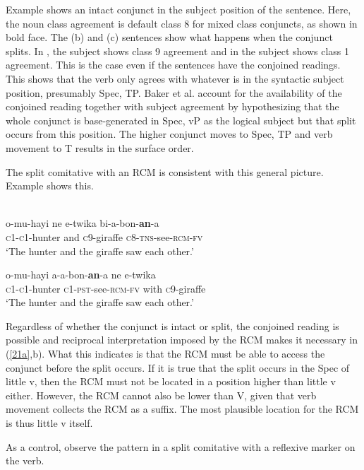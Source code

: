 \documentclass[output=paper]{langsci/langscibook}
\begin{document}
Example  shows an intact conjunct in the subject position of the sentence. Here, the noun class agreement is default class 8 for mixed class conjuncts, as shown in bold face. The (b) and (c) sentences show what happens when the conjunct splits. In , the subject shows class 9 agreement and in  the subject shows class 1 agreement. This is the case even if the sentences have the conjoined readings. This shows that the verb only agrees with whatever is in the syntactic subject position, presumably Spec, TP. Baker et al. account for the availability of the conjoined reading together with subject agreement by hypothesizing that the whole conjunct is base-generated in Spec, vP as the logical subject but that split occurs from this position. The higher conjunct moves to Spec, TP and verb movement to T results in the surface order.  

The split comitative with an RCM is consistent with this general picture. Example  shows this.


\ea\label{ex:safir:21}
  \\
\ea\label{ex:safir:21a}
\gll  o-mu-hayi   ne   e-twika   bi-a-bon-\textbf{an}-a  \\
       \textsc{c1-c1}-hunter   and   \textsc{c}9-giraffe   \textsc{c8-tns}-see-\textsc{rcm}\textsc{-fv} \\
\glt   ‘The hunter and the giraffe saw each other.’

\ex\label{ex:safir:21b}
\gll   o-mu-hayi     a-a-bon-\textbf{an}-a     ne   e-twika\\
       \textsc{c1-c1}-hunter    \textsc{c1-pst}-see-\textsc{rcm}\textsc{-fv}  with  \textsc{c}9-giraffe   \\
\glt   ‘The hunter and the giraffe saw each other.’
\z
\z

Regardless of whether the conjunct is intact or split, the conjoined reading is possible and reciprocal interpretation imposed by the RCM makes it necessary in (\ref{21a},b). What this indicates is that the RCM must be able to access the conjunct before the split occurs. If it is true that the split occurs in the Spec of little v, then the RCM must not be located in a position higher than little v either. However, the RCM cannot also be lower than V, given that verb movement collects the RCM as a suffix. The most plausible location for the RCM is thus little v itself. 

As a control, observe the pattern in a split comitative with a reflexive marker on the verb. 
\end{document}
